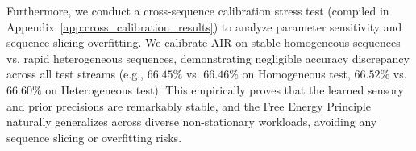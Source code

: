 Furthermore, we conduct a cross-sequence calibration stress test (compiled in Appendix~\ref{app:cross_calibration_results}) to analyze parameter sensitivity and sequence-slicing overfitting. We calibrate AIR on stable homogeneous sequences vs. rapid heterogeneous sequences, demonstrating negligible accuracy discrepancy across all test streams (e.g., $66.45\%$ vs. $66.46\%$ on Homogeneous test, $66.52\%$ vs. $66.60\%$ on Heterogeneous test). This empirically proves that the learned sensory and prior precisions are remarkably stable, and the Free Energy Principle naturally generalizes across diverse non-stationary workloads, avoiding any sequence slicing or overfitting risks.
